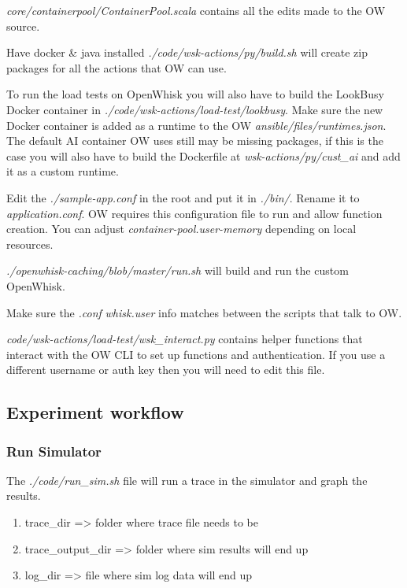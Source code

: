 {{\em core/containerpool/ContainerPool.scala} contains all the edits made to the OW source.


Have docker \& java installed
{\em ./code/wsk-actions/py/build.sh} will create zip packages for all the actions that OW can use.

To run the load tests on OpenWhisk you will also have to build the LookBusy Docker container in {\em ./code/wsk-actions/load-test/lookbusy}.
Make sure the new Docker container is added as a runtime to the OW {\em ansible/files/runtimes.json}.
The default AI container OW uses still may be missing packages, if this is the case you will also have to build the Dockerfile at {\em wsk-actions/py/cust\_ai} and add it as a custom runtime.

Edit the {\em ./sample-app.conf} in the root and put it in {\em ./bin/}.
Rename it to {\em application.conf}.
OW requires this configuration file to run and allow function creation.
You can adjust {\em container-pool.user-memory} depending on local resources.

{\em ./openwhisk-caching/blob/master/run.sh} will build and run the custom OpenWhisk.

Make sure the {\em .conf} {\em whisk.user} info matches between the scripts that talk to OW.

{\em code/wsk-actions/load-test/wsk\_interact.py} contains helper functions that interact with the OW CLI to set up functions and authentication.
If you use a different username or auth key then you will need to edit this file.

\subsection{Experiment workflow} \label{experiments}

\subsubsection{Run Simulator}

The {\em ./code/run\_sim.sh} file will run a trace in the simulator and graph the results.

\begin{enumerate}
  \item trace\_dir => folder where trace file needs to be
  \item trace\_output\_dir => folder where sim results will end up
  \item log\_dir => file where sim log data will end up
\end{enumerate}

}
